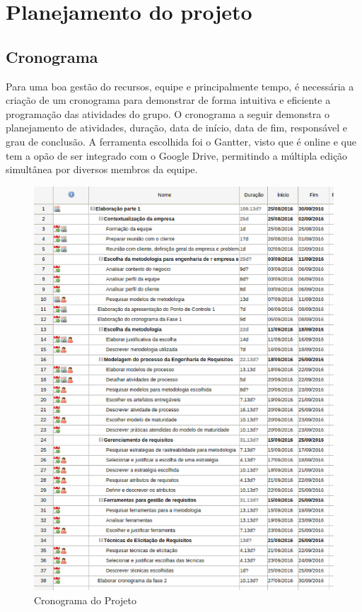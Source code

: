 
\chapter[Planejamento do projeto]{Planejamento do projeto}


\section{\large{Cronograma}} 

\tab Para uma boa gestão do recursos, equipe e principalmente tempo, é necessária a criação de um cronograma para demonstrar de forma intuitiva e eficiente a programação das atividades do grupo. O cronograma a seguir demonstra o planejamento de atividades, duração, data de início, data de fim, responsável e grau de conclusão. A ferramenta escolhida foi o Gantter, visto que é online e que tem a opão de ser integrado com o Google Drive, permitindo a múltipla edição simultânea por diversos membros da equipe. \\
 


\begin{figure}[h]
	\centering
	\label{fig01}
		\includegraphics[keepaspectratio=true,scale=0.6]{figuras/cronogramamaior.eps}
	\caption{Cronograma do Projeto}
\end{figure}